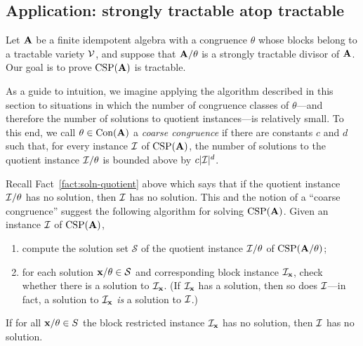 {\subsection{Application: strongly tractable atop tractable}
Let $\mathbf{A}$ be a finite idempotent algebra with a congruence $\theta$ whose
blocks belong to a tractable variety $\mathcal{V}$, and 
suppose that $\mathbf{A}/\theta$ is a strongly tractable divisor of $\mathbf{A}$.
Our goal is to prove $\operatorname{CSP}(\mathbf{A})$ is tractable.

As a guide to intuition, we imagine applying the algorithm described in this section to situations
in which the number of congruence classes of $\theta$---and therefore the number of
solutions to quotient instances---is relatively small.  To this end, we
call $\theta\in \operatorname{Con}(\mathbf{A})$ a \emph{coarse congruence}
if there are constants $c$ and $d$ such that, for every instance $\mathcal{I}$ of $\operatorname{CSP}(\mathbf{A})$,
the number of solutions to the quotient instance $\mathcal{I}/\theta$ is bounded above by $c|\mathcal{I}|^d$.


Recall Fact~\ref{fact:soln-quotient} above which says that if the quotient instance
$\mathcal{I}/\theta$ has no solution, then $\mathcal{I}$ has no solution.
This and the notion of a ``coarse congruence'' suggest the following algorithm for solving $\operatorname{CSP}(\mathbf{A})$.
Given an instance $\mathcal{I}$ of $\operatorname{CSP}(\mathbf{A})$,
\begin{enumerate}
\item compute the solution set $\mathcal S$ of the quotient instance $\mathcal{I}/\theta$ of $\operatorname{CSP}(\mathbf{A}/\theta)$;
\item for each solution $\mathbf{x}/\theta\in \mathcal S$ and corresponding block instance $\mathcal{I}_{\mathbf{x}}$,
check %
whether there is a solution to $\mathcal{I}_{\mathbf{x}}$.
(If $\mathcal{I}_{\mathbf{x}}$ has a solution, then so does $\mathcal{I}$---in fact, a solution to $\mathcal{I}_{\mathbf{x}}$ \emph{is} a solution to $\mathcal{I}$.)
\end{enumerate}
If for all $\mathbf{x}/\theta \in S$ the block restricted instance $\mathcal{I}_{\mathbf{x}}$ has no solution, then $\mathcal{I}$ has no solution.

}
